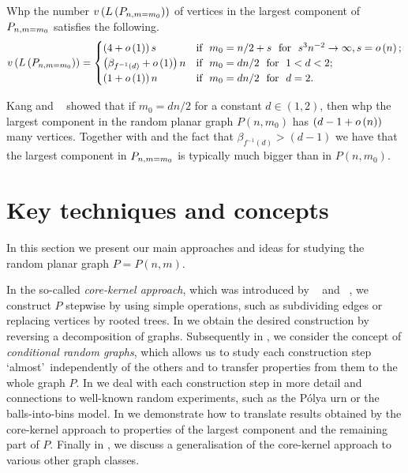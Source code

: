 \begin{thm}\label{thm:process_largest_component}
Whp the number $v\left({L\left(P_{n,m=m_0}\right)}\right)$ of vertices in the largest component of $P_{n,m=m_0}$ satisfies the following.
\begin{align*}
v\left({L\left(P_{n,m=m_0}\right)}\right)=
\begin{cases}
\left(4+o\left(1\right)\right)s& \text{if} ~~ m_0=n/2+s ~~\text{for}~~ s^3n^{-2}\to \infty, s=o\left(n\right);
\\
\left(\beta_{f^{-1}(d)}+o\left(1\right)\right)n& \text{if} ~~ m_0=dn/2 ~~\text{for}~~ 1<d<2;
\\
\left(1+o\left(1\right)\right)n& \text{if} ~~ m_0=dn/2 ~~\text{for}~~ d=2.
\end{cases}
\end{align*}
\end{thm}

Kang and \Luczak\ \cite{KangLuczak2012} showed that if $m_0=dn/2$ for a constant $d\in(1,2)$, then whp the largest component in the random planar graph $P\left(n,m_0\right)$ has $(d-1+o\left(n\right))$ many vertices. Together with  and the fact that $\beta_{f^{-1}(d)}>\left(d-1\right)$ we have that the largest component in $P_{n,m=m_0}$ is typically much bigger than in $P\left(n,m_0\right)$.


\section{Key techniques and concepts}\label{sec:key_technique}

In this section we present our main approaches and ideas for studying the random planar graph $P=P(n,m)$.

In the so-called {\em core-kernel approach}, which was introduced by \Bollobas\ \cite{Bollobas1984b} and \Luczak\ \cite{Luczak1991b}, we construct $P$ stepwise by using simple operations, such as subdividing edges or replacing vertices by rooted trees. In  we obtain the desired construction by reversing a decomposition of graphs. Subsequently in , we consider the concept of {\em conditional random graphs}, which allows us to study each construction step \lq almost\rq\ independently of the others and to transfer properties from them to the whole graph $P$. In  we deal with each construction step in more detail and connections to well-known random experiments, such as the P\'olya urn or the balls-into-bins model. In  we demonstrate how to translate results obtained by the core-kernel approach to properties of the largest component and the remaining part of $P$. Finally in , we discuss a generalisation of the core-kernel approach to various other graph classes.

